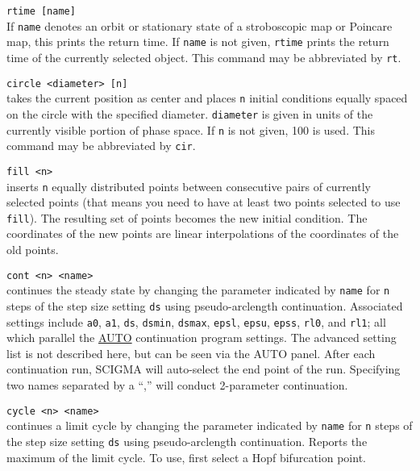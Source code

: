 \documentclass[10pt,a4paper,titlepage]{article}
\newcommand{\cmd}[2]{\item{\T{\hypertarget{#1}{#1}\index[index]{#1} #2}}}
\newcommand{\T}[1]{\texttt{#1}}
\begin{document}
\begin{description}
\cmd{rtime}{[name]}\\
If \T{name} denotes an orbit or stationary state of a stroboscopic map or Poincare map, this prints the return time. If \T{name} is not given, \T{rtime} prints the return time of the currently selected object. This command may be abbreviated by \T{rt}.
\cmd{circle}{<diameter> [n]}\\
takes the current position as center and places \T{n} initial conditions equally spaced on the circle with the specified diameter. \T{diameter} is given in units of the currently visible portion of phase space. If \T{n} is not given, 100 is used. This command may be abbreviated by \T{cir}.
\cmd{fill}{<n>}\\
inserts \T{n} equally distributed points between consecutive pairs of currently selected points (that means you need to have at least two points selected to use \T{fill}). The resulting set of points becomes the new initial condition. The coordinates of the new points are linear interpolations of the coordinates of the old points.
\cmd{cont}{<n> <name>}\\
continues the steady state by changing the parameter indicated by \T{name} for \T{n} steps of the step size setting \T{ds} using pseudo-arclength continuation. Associated settings include \T{a0}, \T{a1}, \T{ds}, \T{dsmin}, \T{dsmax}, \T{epsl}, \T{epsu}, \T{epss}, \T{rl0}, and \T{rl1}; all which parallel the \href{https://depts.washington.edu/bdecon/workshop2012/auto-tutorial/documentation/auto07p\%20manual.pdf}{AUTO} continuation program settings. The advanced setting list is not described here, but can be seen via the AUTO panel. After each continuation run, SCIGMA will auto-select the end point of the run. Specifying two names separated by a ``,'' will conduct 2-parameter continuation.\\
\cmd{cycle}{<n> <name>}\\
continues a limit cycle by changing the parameter indicated by \T{name} for \T{n} steps of the step size setting \T{ds} using pseudo-arclength continuation. Reports the maximum of the limit cycle. To use, first select a Hopf bifurcation point.
\end{description}
\end{document}
